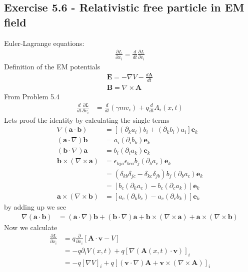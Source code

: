 \documentclass[../main.tex]{subfiles}
\begin{document}
\subsection*{Exercise 5.6 - Relativistic free particle in EM field}
Euler-Lagrange equations:
\begin{align}
\frac{\partial L}{\partial x_i}=\frac{d}{dt}\frac{\partial L}{\partial v_i}
\end{align}
Definition of the EM potentials
\begin{align}
\mathbf{E}=-\nabla V-\frac{d\mathbf{A}}{dt}\\
\mathbf{B}=\nabla\times\mathbf{A}
\end{align}
From Problem 5.4
\begin{align}
\frac{d}{dt}\frac{\partial L}{\partial v_i}
&=\frac{d}{dt}(\gamma mv_i)+q\frac{d}{dt}A_i(x,t)
\end{align}
Lets proof the identity by calculating the single terms
\begin{align}
\nabla(\mathbf{a}\cdot\mathbf{b})&=[(\partial_ka_i)b_i+(\partial_kb_i)a_i]\mathbf{e}_k\\
(\mathbf{a}\cdot\nabla)\mathbf{b}&=a_i(\partial_i b_k)\mathbf{e}_k\\
(\mathbf{b}\cdot\nabla)\mathbf{a}&=b_i(\partial_i a_k)\mathbf{e}_k\\
\mathbf{b}\times(\nabla\times\mathbf{a})
&=\epsilon_{kja}\epsilon_{bca}b_j(\partial_ba_c)\mathbf{e}_k\\
&=(\delta_{kb}\delta_{jc}-\delta_{kc}\delta_{jb})b_j(\partial_ba_c)\mathbf{e}_k\\
&=[b_c(\partial_k a_c)-b_c(\partial_c a_k)]\mathbf{e}_k\\
\mathbf{a}\times(\nabla\times\mathbf{b})
&=[a_c(\partial_k b_c)-a_c(\partial_c b_k)]\mathbf{e}_k
\end{align}
by adding up we see
\begin{align}
\nabla(\mathbf{a}\cdot\mathbf{b})
&=(\mathbf{a}\cdot\nabla)\mathbf{b}
+(\mathbf{b}\cdot\nabla)\mathbf{a}
+\mathbf{b}\times(\nabla\times\mathbf{a})
+\mathbf{a}\times(\nabla\times\mathbf{b})
\end{align}
Now we calculate
\begin{align}
\frac{\partial L}{\partial x_i}
&=q\frac{\partial }{\partial x_i}[\mathbf{A}\cdot\mathbf{v}-V]\\
&=-q\partial_i V(x,t)+q[\nabla(\mathbf{A}(x,t)\cdot\mathbf{v})]_i\\
&=-q[\nabla V]_i+q[(\mathbf{v}\cdot\nabla)\mathbf{A}+\mathbf{v}\times(\nabla\times\mathbf{A})]_i
\end{align}
\end{document}
